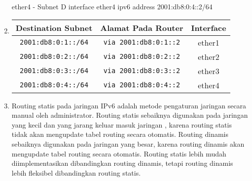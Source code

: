 \begin{enumerate}
	ether4 - Subnet D
	interface ether4
	ipv6 address 2001:db8:0:4::2/64
	\item
    \begin{center}
    \begin{tabular}{|c|c|c|}
    \hline
    \textbf{Destination Subnet} & \textbf{Alamat Pada Router} & \textbf{Interface}  \\
    \hline
	\texttt{2001:db8:0:1::/64} & \texttt{via 2001:db8:0:1::2} & ether1 \\
	\texttt{2001:db8:0:2::/64} & \texttt{via 2001:db8:0:2::2} & ether2 \\
	\texttt{2001:db8:0:3::/64} & \texttt{via 2001:db8:0:3::2} & ether3 \\
	\texttt{2001:db8:0:4::/64} & \texttt{via 2001:db8:0:4::2} & ether4 \\
    \hline
    \end{tabular}
    \label{tab:routing}
    \end{center}
	\item Routing statis pada jaringan IPv6 adalah metode pengaturan jaringan secara manual oleh administrator.
		Routing statis sebaiknya digunakan pada jaringan yang kecil dan yang jarang keluar masuk jaringan
		, karena routing statis tidak akan mengupdate tabel routing secara otomatis. Routing dinamis sebaiknya digunakan pada jaringan yang besar,
		karena routing dinamis akan mengupdate tabel routing secara otomatis. Routing statis lebih mudah diimplementasikan
		dibandingkan routing dinamis, tetapi routing dinamis lebih fleksibel dibandingkan routing statis.
\end{enumerate}